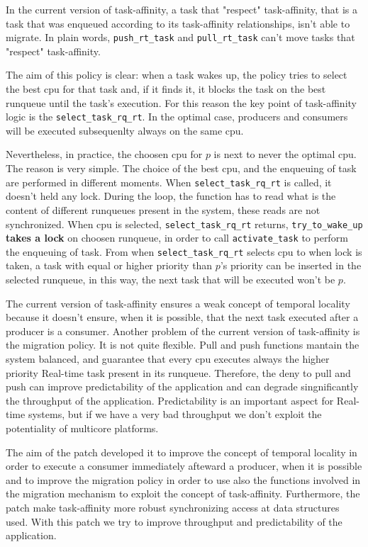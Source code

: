 In the current version of task-affinity, a task that "respect" task-affinity, that is a task that was enqueued according to its task-affinity 
relationships, isn't able to migrate. In plain words, \texttt{push\_rt\_task} and \texttt{pull\_rt\_task} can't move tasks that "respect" task-affinity.

The aim of this policy is clear: when a task wakes up, the policy tries to select the best cpu for that task and, if it finds it, it blocks the task on the 
best runqueue until the task's execution. For this reason the key point of task-affinity logic is the \texttt{select\_task\_rq\_rt}. In the optimal case, 
producers and consumers will be executed subsequenlty always on the same cpu.

Nevertheless, in practice, the choosen cpu for $p$ is next to never the optimal cpu. The reason is very simple. The choice of the best 
cpu, and the enqueuing of task are performed in different moments. When \texttt{select\_task\_rq\_rt} is called, it doesn't held any lock. During the loop, 
the function has to read what is the content of different runqueues present in the system, these reads are not synchronized. When cpu is selected, 
\texttt{select\_task\_rq\_rt} returns, \texttt{try\_to\_wake\_up} \textbf{takes a lock} on choosen runqueue, in order to call \texttt{activate\_task} 
to perform the enqueuing of task. From when \texttt{select\_task\_rq\_rt} selects cpu to when lock is taken, a task with equal or higher priority than 
$p$'s priority can be inserted in the selected runqueue, in this way, the next task that will be executed won't be $p$. 

The current version of task-affinity ensures a weak concept of temporal locality because it doesn't ensure, when it is possible, that the next task executed
after a producer is a consumer. Another problem of the current version of task-affinity is the migration policy. It is not quite flexible. Pull and push 
functions mantain the system balanced, and guarantee that every cpu executes always the higher priority Real-time task present in its runqueue.
Therefore, the deny to pull and push can improve predictability of the application and can degrade singnificantly the throughput of the application.
Predictability is an important aspect for Real-time systems, but if we have a very bad throughput we don't exploit the potentiality of multicore platforms.

The aim of the patch developed it to improve the concept of temporal locality in order to execute a consumer immediately afteward a producer, when it is 
possible and to improve the migration policy in order to use also the functions involved in the migration mechanism to exploit the concept of task-affinity.
Furthermore, the patch make task-affinity more robust synchronizing access at data structures used. With this patch we try to improve throughput and 
predictability of the application. 


